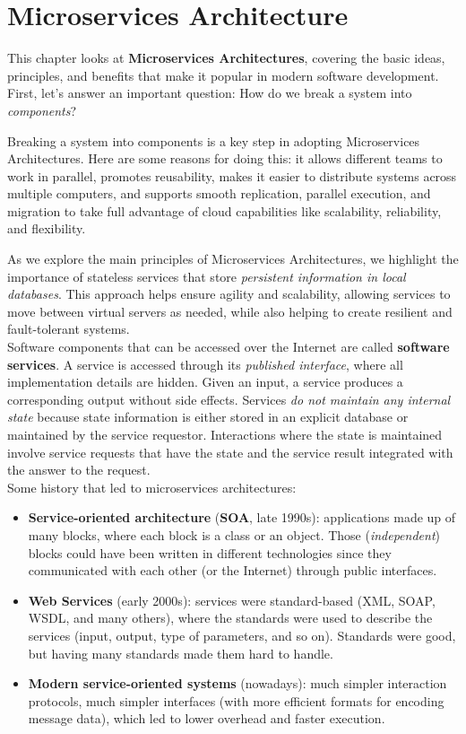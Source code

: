 \chapter{Microservices Architecture}

This chapter looks at \textbf{Microservices Architectures}, covering the basic ideas, principles, and benefits that make it popular in modern software development. First, let’s answer an important question: How do we break a system into \textit{components}?

Breaking a system into components is a key step in adopting Microservices Architectures. Here are some reasons for doing this: it allows different teams to work in parallel, promotes reusability, makes it easier to distribute systems across multiple computers, and supports smooth replication, parallel execution, and migration to take full advantage of cloud capabilities like scalability, reliability, and flexibility.

As we explore the main principles of Microservices Architectures, we highlight the importance of stateless services that store \textit{persistent information in local databases}. This approach helps ensure agility and scalability, allowing services to move between virtual servers as needed, while also helping to create resilient and fault-tolerant systems. \\

Software components that can be accessed over the Internet are called \textbf{software services}. A service is accessed through its \textit{published interface}, where all implementation details are hidden. Given an input, a service produces a corresponding output without side effects. Services \textit{do not maintain any internal state} because state information is either stored in an explicit database or maintained by the service requestor. Interactions where the state is maintained involve service requests that have the state and the service result integrated with the answer to the request. \\

\noindent Some history that led to microservices architectures:

\begin{itemize}
    \item \textbf{Service-oriented architecture} (\textbf{SOA}, late 1990s): applications made up of many blocks, where each block is a class or an object. Those (\textit{independent}) blocks could have been written in different technologies since they communicated with each other (or the Internet) through public interfaces.
    \newpage
    \item \textbf{Web Services} (early 2000s): services were standard-based (XML, SOAP, WSDL, and many others), where the standards were used to describe the services (input, output, type of parameters, and so on). Standards were good, but having many standards made them hard to handle.
    \item \textbf{Modern service-oriented systems} (nowadays): much simpler interaction protocols, much simpler interfaces (with more efficient formats for encoding message data), which led to lower overhead and faster execution.
\end{itemize}

